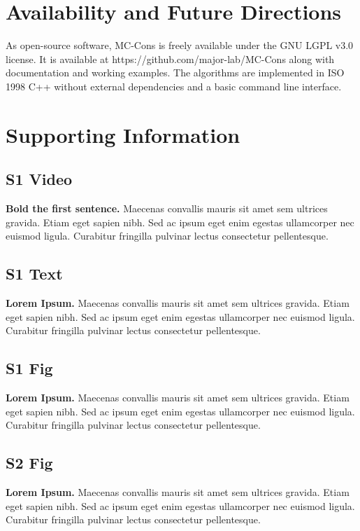 \documentclass[10pt,letterpaper]{article}
\begin{document}
\section*{Availability and Future Directions} %
As open-source software, MC-Cons is freely available under the GNU LGPL v3.0 license. It is available at https://github.com/major-lab/MC-Cons along with documentation and working examples. The algorithms are implemented in ISO 1998 C++ without external dependencies and a basic command line interface.

\newpage
\section*{Supporting Information}

\subsection*{S1 Video}
\label{S1_Video}
{\bf Bold the first sentence.}  Maecenas convallis mauris sit amet sem ultrices gravida. Etiam eget sapien nibh. Sed ac ipsum eget enim egestas ullamcorper nec euismod ligula. Curabitur fringilla pulvinar lectus consectetur pellentesque.

\subsection*{S1 Text}
\label{S1_Text}
{\bf Lorem Ipsum.} Maecenas convallis mauris sit amet sem ultrices gravida. Etiam eget sapien nibh. Sed ac ipsum eget enim egestas ullamcorper nec euismod ligula. Curabitur fringilla pulvinar lectus consectetur pellentesque.

\subsection*{S1 Fig}
\label{S1_Fig}
{\bf Lorem Ipsum.} Maecenas convallis mauris sit amet sem ultrices gravida. Etiam eget sapien nibh. Sed ac ipsum eget enim egestas ullamcorper nec euismod ligula. Curabitur fringilla pulvinar lectus consectetur pellentesque.

\subsection*{S2 Fig}
\label{S2_Fig}
{\bf Lorem Ipsum.} Maecenas convallis mauris sit amet sem ultrices gravida. Etiam eget sapien nibh. Sed ac ipsum eget enim egestas ullamcorper nec euismod ligula. Curabitur fringilla pulvinar lectus consectetur pellentesque.
\end{document}
